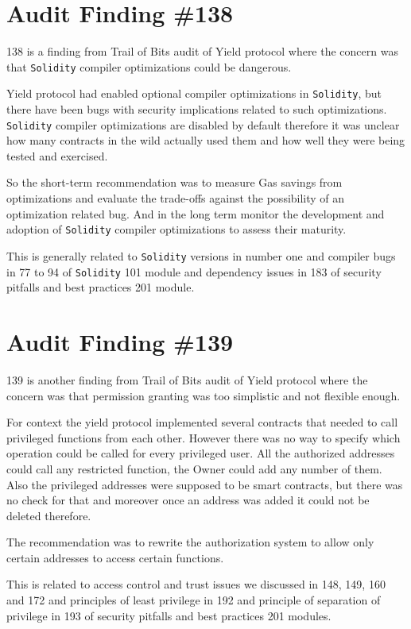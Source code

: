 \section{Audit Finding \#138}

138 is a finding from Trail of Bits audit of Yield protocol where the concern was that \verb|Solidity| compiler optimizations could be dangerous. 

Yield protocol had enabled optional compiler optimizations in \verb|Solidity|, but there have been bugs with security implications related to such optimizations. \verb|Solidity| compiler optimizations are disabled by default therefore it was unclear how many contracts in the wild actually used them and how well they were being tested and exercised. 

So the short-term recommendation was to measure Gas savings from optimizations and evaluate the trade-offs against the possibility of an optimization related bug. And in the long term monitor the development and adoption of \verb|Solidity| compiler optimizations to assess their maturity. 

This is generally related to \verb|Solidity| versions in number one and compiler bugs in 77 to 94 of \verb|Solidity| 101 module and dependency issues in 183 of security pitfalls and best practices 201 module.

\section{Audit Finding \#139}

139 is another finding from Trail of Bits audit of Yield protocol where the concern was that permission granting was too simplistic and not flexible enough. 

For context the yield protocol implemented several contracts that needed to call privileged functions from each other. However there was no way to specify which operation could be called for every privileged user. All the authorized addresses could call any restricted function, the Owner could add any number of them. Also the privileged addresses were supposed to be smart contracts, but there was no check for that and moreover once an address was added it could not be deleted therefore.

The recommendation was to rewrite the authorization system to allow only certain addresses to access certain functions.

This is related to access control and trust issues we discussed in 148, 149, 160 and 172 and principles of least privilege in 192 and principle of separation of privilege in 193 of security pitfalls and best practices 201 modules.

